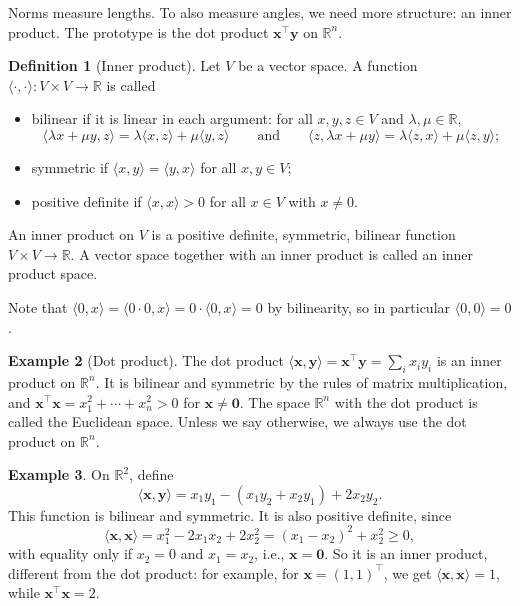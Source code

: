 \documentclass[11pt]{article}
\newcommand{\ip}[2]{\langle #1, #2 \rangle}
\theoremstyle{definition}
\newtheorem{definition}{Definition}[section]
\newtheorem{example}[definition]{Example}
\theoremstyle{plain}
\theoremstyle{remark}
\begin{document}
Norms measure lengths. To also measure angles, we need more structure: an inner product. The prototype is the dot product $\mathbf{x}^\top \mathbf{y}$ on $\mathbb{R}^n$.

\begin{definition}[Inner product]\label{def:inner-product}
    Let $V$ be a vector space. A function $\ip{\cdot}{\cdot}: V \times V \to \mathbb{R}$ is called
    \begin{itemize}
        \item bilinear if it is linear in each argument: for all $x, y, z \in V$ and $\lambda, \mu \in \mathbb{R}$,
        \[\ip{\lambda x + \mu y}{z} = \lambda \ip{x}{z} + \mu \ip{y}{z} \qquad \text{and} \qquad \ip{z}{\lambda x + \mu y} = \lambda \ip{z}{x} + \mu \ip{z}{y};\]
        \item symmetric if $\ip{x}{y} = \ip{y}{x}$ for all $x, y \in V$;
        \item positive definite if $\ip{x}{x} > 0$ for all $x \in V$ with $x \neq 0$.
    \end{itemize}
    An inner product on $V$ is a positive definite, symmetric, bilinear function $V \times V \to \mathbb{R}$. A vector space together with an inner product is called an inner product space.
\end{definition}

Note that $\ip{0}{x} = \ip{0 \cdot 0}{x} = 0 \cdot \ip{0}{x} = 0$ by bilinearity, so in particular $\ip{0}{0} = 0$.

\begin{example}[Dot product]\label{ex:dot}
    The dot product $\ip{\mathbf{x}}{\mathbf{y}} = \mathbf{x}^\top \mathbf{y} = \sum_i x_i y_i$ is an inner product on $\mathbb{R}^n$. It is bilinear and symmetric by the rules of matrix multiplication, and $\mathbf{x}^\top \mathbf{x} = x_1^2 + \cdots + x_n^2 > 0$ for $\mathbf{x} \neq \mathbf{0}$. The space $\mathbb{R}^n$ with the dot product is called the Euclidean space. Unless we say otherwise, we always use the dot product on $\mathbb{R}^n$.
\end{example}

\begin{example}\label{ex:ip-A}
    On $\mathbb{R}^2$, define
    \[\ip{\mathbf{x}}{\mathbf{y}} = x_1 y_1 - (x_1 y_2 + x_2 y_1) + 2 x_2 y_2.\]
    This function is bilinear and symmetric. It is also positive definite, since
    \[\ip{\mathbf{x}}{\mathbf{x}} = x_1^2 - 2 x_1 x_2 + 2 x_2^2 = (x_1 - x_2)^2 + x_2^2 \geq 0,\]
    with equality only if $x_2 = 0$ and $x_1 = x_2$, i.e., $\mathbf{x} = \mathbf{0}$. So it is an inner product, different from the dot product: for example, for $\mathbf{x} = (1, 1)^\top$, we get $\ip{\mathbf{x}}{\mathbf{x}} = 1$, while $\mathbf{x}^\top \mathbf{x} = 2$.
\end{example}
\end{document}
